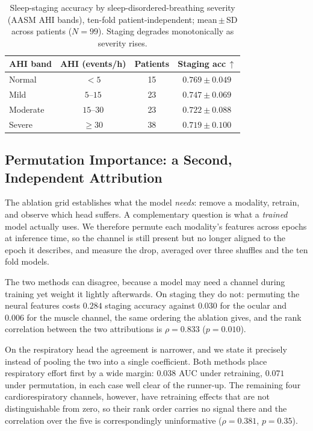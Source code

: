 \documentclass{ieeeaccess}
\begin{document}
\begin{table}[t]
\caption{Sleep-staging accuracy by sleep-disordered-breathing severity (AASM AHI bands),
ten-fold patient-independent; mean\,$\pm$\,SD across patients ($N=99$). Staging degrades
monotonically as severity rises.}
\label{tab:severity}
\centering
\small
\begin{tabular}{lccc}
\toprule
AHI band & AHI (events/h) & Patients & Staging acc\,$\uparrow$ \\
\midrule
Normal   & $<5$       & 15 & $0.769 \pm 0.049$ \\
Mild     & $5$--$15$  & 23 & $0.747 \pm 0.069$ \\
Moderate & $15$--$30$ & 23 & $0.722 \pm 0.088$ \\
Severe   & $\geq 30$  & 38 & $0.719 \pm 0.100$ \\
\bottomrule
\end{tabular}
\end{table}

\subsection{Permutation Importance: a Second, Independent Attribution}
The ablation grid establishes what the model \emph{needs}: remove a modality, retrain, and
observe which head suffers. A complementary question is what a \emph{trained} model actually
uses. We therefore permute each modality's features across epochs at inference time, so the
channel is still present but no longer aligned to the epoch it describes, and measure the
drop, averaged over three shuffles and the ten fold models.

The two methods can disagree, because a model may need a channel during training yet weight it
lightly afterwards. On staging they do not: permuting the neural features costs $0.284$ staging
accuracy against $0.030$ for the ocular and $0.006$ for the muscle channel, the same ordering
the ablation gives, and the rank correlation between the two attributions is $\rho=0.833$
($p=0.010$).

On the respiratory head the agreement is narrower, and we state it precisely instead of
pooling the two into a single coefficient. Both methods place respiratory effort first by a wide
margin: $0.038$ AUC under retraining, $0.071$ under permutation, in each case well clear of
the runner-up. The remaining four cardiorespiratory channels, however, have retraining effects
that are not distinguishable from zero, so their rank order carries no signal there and the
correlation over the five is correspondingly uninformative ($\rho=0.381$, $p=0.35$).
\end{document}
